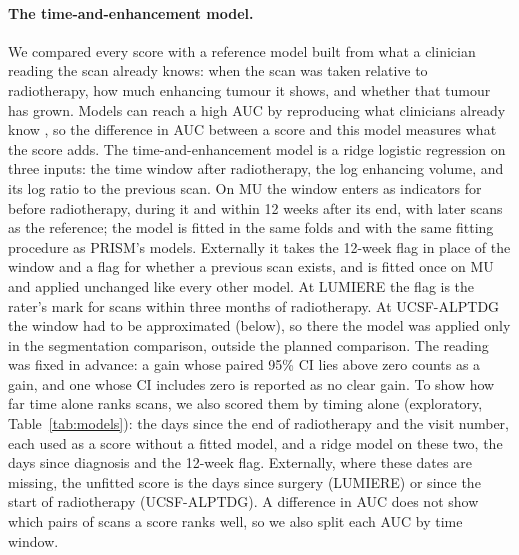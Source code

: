 \paragraph*{The time-and-enhancement model.} We compared every score with a reference model built from what a
clinician reading the scan already knows: when the scan was taken relative to radiotherapy, how much enhancing tumour
it shows, and whether that tumour has grown. Models can reach a high AUC by reproducing what clinicians already know
\citep{beaulieujones2021}, so the difference in AUC between a score and this model measures what the score adds. The
time-and-enhancement model is a ridge logistic regression on three inputs: the time window after radiotherapy, the log
enhancing volume, and its log ratio to the previous scan. On MU the window enters as indicators for before
radiotherapy, during it and within 12 weeks after its end, with later scans as the reference; the model is fitted in
the same folds and with the same fitting procedure as PRISM's models. Externally it takes the 12-week flag in place of
the window and a flag for whether a previous scan exists, and is fitted once on MU and applied unchanged like every
other model. At LUMIERE the flag is the rater's mark for scans within three months of radiotherapy. At UCSF-ALPTDG the
window had to be approximated (below), so there the model was applied only in the segmentation comparison, outside the
planned comparison. The reading was fixed in advance: a gain whose paired 95\% CI lies above zero counts as a gain,
and one whose CI includes zero is reported as no clear gain. To show how far time alone ranks scans, we also scored
them by timing alone (exploratory, Table~\ref{tab:models}): the days since the end of radiotherapy and the visit
number, each used as a score without a fitted model, and a ridge model on these two, the days since diagnosis and the
12-week flag. Externally, where these dates are missing, the unfitted score is the days since surgery (LUMIERE) or
since the start of radiotherapy (UCSF-ALPTDG). A difference in AUC does not show which pairs of scans a score ranks
well, so we also split each AUC by time window.


